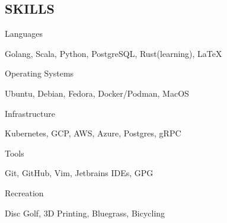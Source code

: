 \documentclass[line, margin, 10.5pt]{res}
\begin{document}
\begin{resume}
\section{\small SKILLS}
\begin{compactdesc}
\item[Languages] \hfill \begin{inparaenum} {Golang, Scala, Python, PostgreSQL, Rust(learning), \LaTeX} \end{inparaenum}
\item[Operating Systems] \hfill \begin{inparaenum} {Ubuntu, Debian, Fedora, Docker/Podman, MacOS} \end{inparaenum}
\item[Infrastructure] \hfill \begin{inparaenum} {Kubernetes, GCP, AWS, Azure, Postgres, gRPC} \end{inparaenum}
\item[Tools] \hfill \begin{inparaenum} {Git, GitHub, Vim, Jetbrains IDEs, GPG} \end{inparaenum}
\item[Recreation] \hfill \begin{inparaenum} {Disc Golf, 3D Printing, Bluegrass, Bicycling} \end{inparaenum}
\end{compactdesc}

\end{resume}
\end{document}
